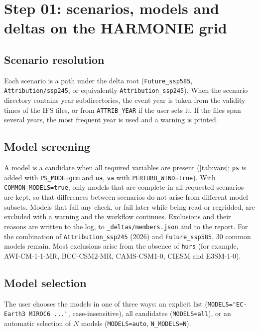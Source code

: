\documentclass[11pt,a4paper]{article}
\newcommand{\code}[1]{\texttt{#1}}
\begin{document}
\section{Step 01: scenarios, models and deltas on the HARMONIE grid}
\label{sec:step01}

\subsection{Scenario resolution}

Each scenario is a path under the delta root (\code{Future\_ssp585},
\code{Attribution/ssp245}, or equivalently \code{Attribution\_ssp245}). When
the scenario directory contains year subdirectories, the event year is taken
from the validity times of the IFS files, or from \code{ATTRIB\_YEAR} if the
user sets it. If the files span several years, the most frequent year is used
and a warning is printed.

\subsection{Model screening}

A model is a candidate when all required variables are present (\cref{tab:vars};
\code{ps} is added with \code{PS\_MODE=gcm} and \code{ua}, \code{va} with
\code{PERTURB\_WIND=true}). With \code{COMMON\_MODELS=true}, only models that
are complete in all requested scenarios are kept, so that differences between
scenarios do not arise from different model subsets. Models that fail any
check, or fail later while being read or regridded, are excluded with a
warning and the workflow continues. Exclusions and their reasons are written
to the log, to \code{\_deltas/members.json} and to the report. For the
combination of \code{Attribution\_ssp245} (2026) and \code{Future\_ssp585},
30 common models remain. Most exclusions arise from the absence of
\code{hurs} (for example, AWI-CM-1-1-MR, BCC-CSM2-MR, CAMS-CSM1-0, CIESM and
E3SM-1-0).

\subsection{Model selection}
\label{sec:selection}

The user chooses the models in one of three ways: an explicit list
(\code{MODELS="EC-Earth3 MIROC6 ..."}, case-insensitive), all candidates
(\code{MODELS=all}), or an automatic selection of $N$ models
(\code{MODELS=auto}, \code{N\_MODELS=N}).
\end{document}
